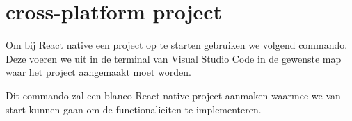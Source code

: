 \section{cross-platform project}
Om bij React native een project op te starten gebruiken we volgend commando. Deze voeren we uit in de terminal van Visual Studio Code in de gewenste map waar het project aangemaakt moet worden.


Dit commando zal een blanco React native project aanmaken waarmee we van start kunnen gaan om de functionalieiten te implementeren.

